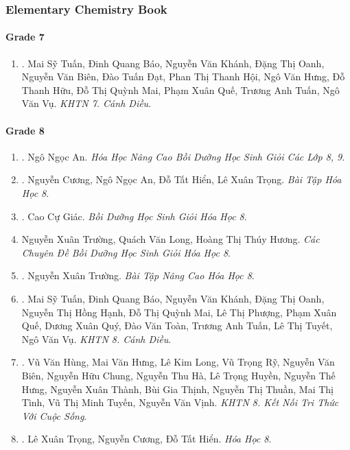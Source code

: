 \documentclass{article}
\begin{document}
\subsubsection{Elementary Chemistry Book}

\paragraph{Grade 7}

\begin{enumerate}
	\item \cite{SGK_KHTN_7_Canh_Dieu}. Mai Sỹ Tuấn, Đinh Quang Báo, Nguyễn Văn Khánh, Đặng Thị Oanh, Nguyễn Văn Biên, Đào Tuấn Đạt, Phan Thị Thanh Hội, Ngô Văn Hưng, Đỗ Thanh Hữu, Đỗ Thị Quỳnh Mai, Phạm Xuân Quế, Trương Anh Tuấn, Ngô Văn Vụ. {\it KHTN 7. Cánh Diều}.\hfill{\sf[reading]}
\end{enumerate}

\paragraph{Grade 8}

\begin{enumerate}
	\item \cite{An_Hoa_Hoc_nang_cao_8_9}. Ngô Ngọc An. {\it Hóa Học Nâng Cao Bồi Dưỡng Học Sinh Giỏi Các Lớp 8, 9}.\hfill{\sf[done]}
	
	\item \cite{SBT_Hoa_Hoc_8}. Nguyễn Cương, Ngô Ngọc An, Đỗ Tất Hiển, Lê Xuân Trọng. {\it Bài Tập Hóa Học 8}.\hfill{\sf[reading]}
	
	\item \cite{Giac2021}. Cao Cự Giác. {\it Bồi Dưỡng Học Sinh Giỏi Hóa Học 8}.\hfill{\sf[reading]}
	
	\item Nguyễn Xuân Trường, Quách Văn Long, Hoàng Thị Thúy Hương. {\it Các Chuyên Đề Bồi Dưỡng Học Sinh Giỏi Hóa Học 8}.
	
	\item \cite{Truong_BTNC_Hoa_Hoc_8_2022}. Nguyễn Xuân Trường. {\it Bài Tập Nâng Cao Hóa Học 8}.\hfill{\sf[reading]}
	
	\item \cite{SGK_KHTN_8_Canh_Dieu}. Mai Sỹ Tuấn, Đinh Quang Báo, Nguyễn Văn Khánh, Đặng Thị Oanh, Nguyễn Thị Hồng Hạnh, Đỗ Thị Quỳnh Mai, Lê Thị Phượng, Phạm Xuân Quế, Dương Xuân Quý, Đào Văn Toàn, Trương Anh Tuấn, Lê Thị Tuyết, Ngô Văn Vụ. {\it KHTN 8. Cánh Diều}.\hfill{\sf[reading]}
	
	\item \cite{SGK_KHTN_8_KNTTVCS}. Vũ Văn Hùng, Mai Văn Hưng, Lê Kim Long, Vũ Trọng Rỹ, Nguyễn Văn Biên, Nguyễn Hữu Chung, Nguyễn Thu Hà, Lê Trọng Huyền, Nguyễn Thế Hưng, Nguyễn Xuân Thành, Bùi Gia Thịnh, Nguyễn Thị Thuần, Mai Thị Tình, Vũ Thị Minh Tuyến, Nguyễn Văn Vịnh. {\it KHTN 8. Kết Nối Tri Thức Với Cuộc Sống}.\hfill{\sf[reading]}
	
	\item \cite{SGK_Hoa_Hoc_8}. Lê Xuân Trọng, Nguyễn Cương, Đỗ Tất Hiển. {\it Hóa Học 8}.\hfill{\sf[reading]}
\end{enumerate}
\end{document}
